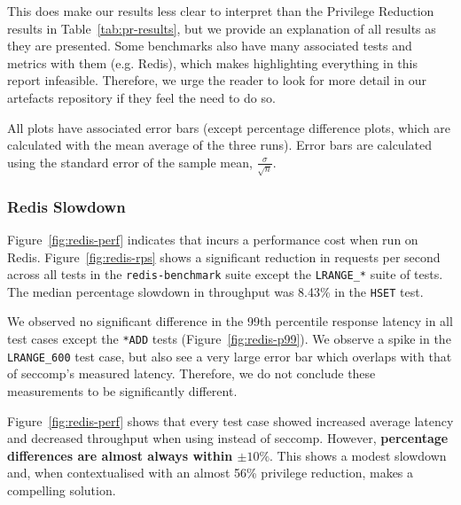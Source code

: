 This does make our results less clear to interpret than the Privilege Reduction
results in Table~\ref{tab:pr-results}, but we provide an explanation of all
results as they are presented. Some benchmarks also have many associated tests
and metrics with them (e.g. Redis), which makes highlighting everything in this
report infeasible. Therefore, we urge the reader to look for more detail in our
artefacts repository if they feel the need to do so.

All plots have associated error bars (except percentage difference plots, which
are calculated with the mean average of the three runs). Error bars are
calculated using the standard error of the sample mean, 
$\frac{\sigma}{\sqrt n}$.

\subsubsection{Redis Slowdown}\label{subsubsec:redis-slowdown}

Figure~\ref{fig:redis-perf} indicates that \af incurs a performance cost when
run on Redis. Figure~\ref{fig:redis-rps} shows a significant reduction in
requests per second across all tests in the \texttt{redis-benchmark} suite
except the \texttt{LRANGE\_*} suite of tests. The median percentage slowdown in
throughput was 8.43\% in the \texttt{HSET} test.

We observed no significant difference in the 99th percentile response
latency in all test cases except the \texttt{*ADD} tests 
(Figure~\ref{fig:redis-p99}). We observe a spike in the \texttt{LRANGE\_600}
test case, but also see a very large error bar which overlaps with that of
seccomp's measured latency. Therefore, we do not conclude these measurements to
be significantly different.

Figure~\ref{fig:redis-perf} shows that every test case showed increased
average latency and decreased throughput when using \af instead of seccomp.
However, \textbf{percentage differences are almost always within $\pm 10\%$}.
This shows a modest slowdown and, when contextualised with an almost 56\%
privilege reduction, makes \af a compelling solution.

